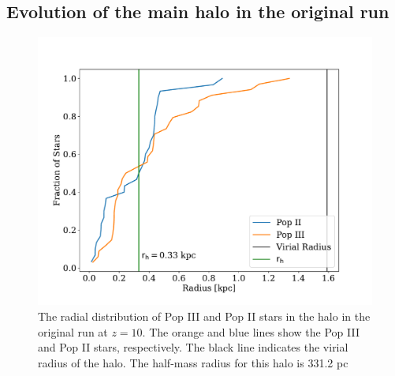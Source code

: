 \documentclass[fleqn,usenatbib]{mnras}
\begin{document}
\subsection{Evolution of the main halo \textbf{in the original run}} \label{sec:main_halo}
\begin{figure} 
	\includegraphics[width=\columnwidth]{plots/run_OG_stellar_dist.pdf}
	\caption[Radial distribution of Pop II and III stars in the main halo.]{The radial distribution of Pop III and Pop II stars in the halo in the original run at $z = 10$. The orange and blue lines show the Pop III and Pop II stars, respectively. The black line indicates the virial radius of the halo. The half-mass radius for this halo is 331.2 pc}
	\label{fig:og_stellarmass}
\end{figure}
\end{document}
